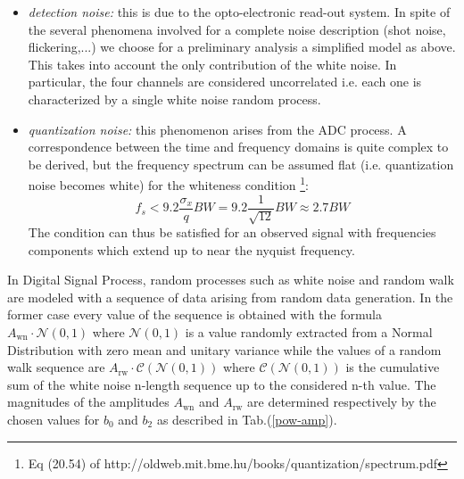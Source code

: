 \documentclass[ fontsize=11pt]{scrartcl} %
\numberwithin{equation}{section} %
\numberwithin{figure}{section} %
\numberwithin{table}{section} %
\begin{document}
\begin{itemize}
\item \textsl{detection noise:} this is due to the opto-electronic read-out system. In spite of the several phenomena involved for a complete noise description (shot noise, flickering,...) we choose  for a preliminary analysis a simplified model as above. This takes  into account the only contribution of the white noise. In particular, the four channels are considered uncorrelated i.e. each one is characterized by a single white noise random process. 

\item \textsl{quantization noise:} this phenomenon arises from the ADC process. A correspondence between the time and frequency domains is quite complex to be derived, but the frequency spectrum can be assumed flat (i.e. quantization noise becomes white) for the whiteness condition \footnote{Eq (20.54) of http://oldweb.mit.bme.hu/books/quantization/spectrum.pdf}:
\begin{equation}
f_s<9.2 \frac{\sigma_x}{q}BW=9.2\frac{1}{\sqrt{12}}BW\approx 2.7BW
\end{equation}
The condition can thus be satisfied for an observed signal with frequencies components which extend up to near the nyquist frequency.

\end{itemize}

In Digital Signal Process, random processes such as white noise and random walk are modeled with a sequence of data arising from random data generation. In the former case every value of the sequence is obtained with the formula $A_{\text{wn}} \cdot \mathcal{N}(0,1) $ where $\mathcal{N}(0,1) $ is a value randomly extracted from a Normal Distribution with zero mean and unitary variance while the values of a random walk sequence are $A_{\text{rw}} \cdot \mathcal{C}(\mathcal{N}(0,1) )$ where  $\mathcal{C}(\mathcal{N}(0,1) )$ is the cumulative sum of the white noise n-length sequence up to the considered n-th value.
The magnitudes of the amplitudes $A_{\text{wn}}$ and $A_{\text{rw}}$ are determined respectively by the chosen values for $b_0$ and $b_2$ as described in Tab.(\ref{pow-amp}).
\end{document}

